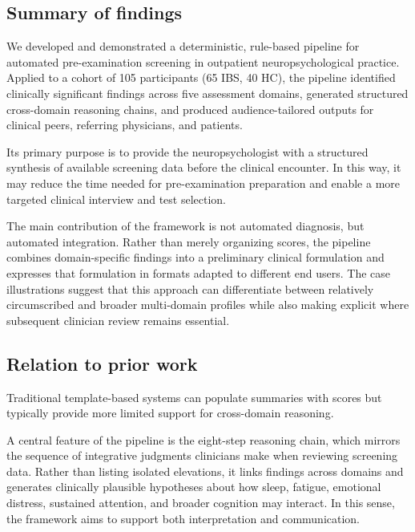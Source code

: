 \documentclass[11pt,a4paper]{article}
\begin{document}
\subsection{Summary of findings}

We developed and demonstrated a deterministic, rule-based pipeline for automated pre-examination screening in outpatient neuropsychological practice. Applied to a cohort of 105 participants (65 IBS, 40 HC), the pipeline identified clinically significant findings across five assessment domains, generated structured cross-domain reasoning chains, and produced audience-tailored outputs for clinical peers, referring physicians, and patients.

Its primary purpose is to provide the neuropsychologist with a structured synthesis of available screening data before the clinical encounter. In this way, it may reduce the time needed for pre-examination preparation and enable a more targeted clinical interview and test selection.

The main contribution of the framework is not automated diagnosis, but automated integration. Rather than merely organizing scores, the pipeline combines domain-specific findings into a preliminary clinical formulation and expresses that formulation in formats adapted to different end users. 
The case illustrations suggest that this approach can differentiate between relatively circumscribed and broader multi-domain profiles while also making explicit where subsequent clinician review remains essential.

\subsection{Relation to prior work}

Traditional template-based systems can populate summaries with scores but typically provide more limited support for cross-domain reasoning.

A central feature of the pipeline is the eight-step reasoning chain, which mirrors the sequence of integrative judgments clinicians make when reviewing screening data. Rather than listing isolated elevations, it links findings across domains and generates clinically plausible hypotheses about how sleep, fatigue, emotional distress, sustained attention, and broader cognition may interact. In this sense, the framework aims to support both interpretation and communication.
\end{document}
